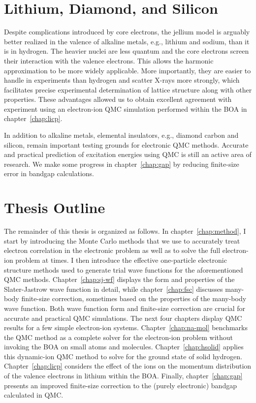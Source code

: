 \section{Lithium, Diamond, and Silicon}
Despite complications introduced by core electrons, the jellium model is arguably better realized in the valence of alkaline metals, e.g., lithium and sodium, than it is in hydrogen.
The heavier nuclei are less quantum and the core electrons screen their interaction with the valence electrons.
This allows the harmonic approximation to be more widely applicable.
More importantly, they are easier to handle in experiments than hydrogen and scatter X-rays more strongly, which facilitates precise experimental determination of lattice structure along with other properties.
These advantages allowed us to obtain excellent agreement with experiment using an electron-ion QMC simulation performed within the BOA in chapter~\ref{chap:licp}.

In addition to alkaline metals, elemental insulators, e.g., diamond carbon and silicon, remain important testing grounds for electronic QMC methods. Accurate and practical prediction of excitation energies using QMC is still an active area of research. We make some progress in chapter~\ref{chap:gap} by reducing finite-size error in bandgap calculations.

\section{Thesis Outline}
The remainder of this thesis is organized as follows. In chapter~\ref{chap:method}, I start by introducing the Monte Carlo methods that we use to accurately treat electron correlation in the electronic problem as well as to solve the full electron-ion problem at times. I then introduce the effective one-particle electronic structure methods used to generate trial wave functions for the aforementioned QMC methods.
Chapter~\ref{chap:sj-wf} displays the form and properties of the Slater-Jastrow wave function in detail, while chapter~\ref{chap:fsc} discusses many-body finite-size correction, sometimes based on the properties of the many-body wave function.
Both wave function form and finite-size correction are crucial for accurate and practical QMC simulations.
The next four chapters display QMC results for a few simple electron-ion systems.
Chapter~\ref{chap:na-mol} benchmarks the QMC method as a complete solver for the electron-ion problem without invoking the BOA on small atoms and molecules.
Chapter~\ref{chap:hsolid} applies this dynamic-ion QMC method to solve for the ground state of solid hydrogen.
Chapter~\ref{chap:licp} considers the effect of the ions on the momentum distribution of the valence electrons in lithium within the BOA.
Finally, chapter~\ref{chap:gap} presents an improved finite-size correction to the (purely electronic) bandgap calculated in QMC.